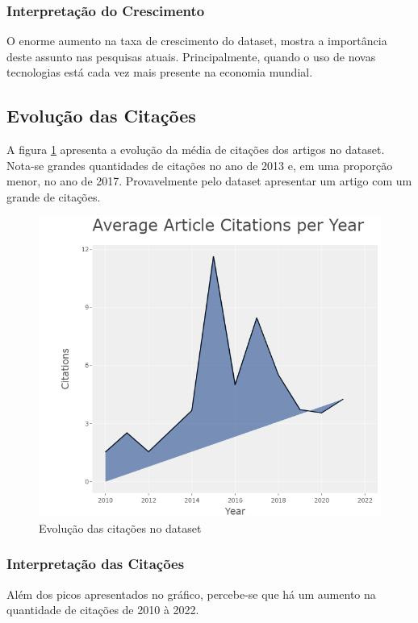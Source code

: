      
\subsubsection{Interpretação do Crescimento}

O enorme aumento na taxa de crescimento do dataset, mostra a importância deste assunto nas pesquisas atuais. Principalmente, quando o uso de novas tecnologias está cada vez mais presente na economia mundial.

\subsection{Evolução das Citações}
A figura \ref{fig:average-cit} apresenta a evolução da média de citações dos artigos no dataset. Nota-se grandes quantidades de citações no ano de 2013 e, em uma proporção menor, no ano de 2017. Provavelmente pelo dataset apresentar um artigo com um grande de citações.

\begin{figure}[ht]
    \centering
    \includegraphics[width=12cm]{experiments/Tong00020/PesquisaBibliometrica/DataSet/MASSA@Tong00020-Average Citations per Year.png}
    \caption{Evolução das citações no dataset}
    \label{fig:average-cit}
\end{figure}

\subsubsection{Interpretação das Citações}
Além dos picos apresentados no gráfico, percebe-se que há um aumento na quantidade de citações de 2010 à 2022.

